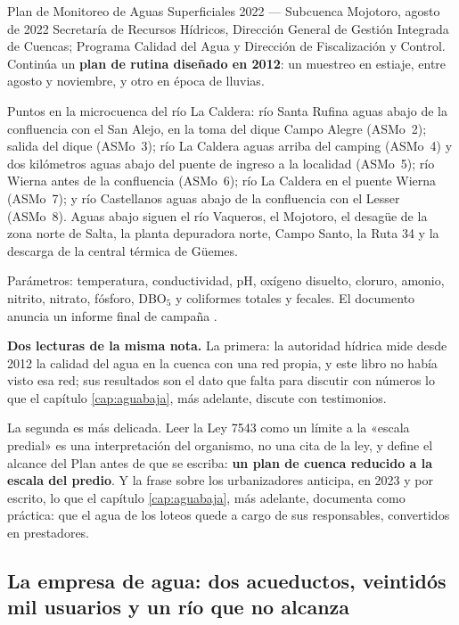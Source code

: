 \begin{ficha}{Plan de Monitoreo de Aguas Superficiales 2022 --- Subcuenca Mojotoro, agosto de 2022}
Secretaría de Recursos Hídricos, Dirección General de Gestión Integrada de Cuencas; Programa Calidad del Agua y Dirección de Fiscalización y Control. Continúa un \textbf{plan de rutina diseñado en 2012}: un muestreo en estiaje, entre agosto y noviembre, y otro en época de lluvias.

Puntos en la microcuenca del río La Caldera: río Santa Rufina aguas abajo de la confluencia con el San Alejo, en la toma del dique Campo Alegre (ASMo~2); salida del dique (ASMo~3); río La Caldera aguas arriba del camping (ASMo~4) y dos kilómetros aguas abajo del puente de ingreso a la localidad (ASMo~5); río Wierna antes de la confluencia (ASMo~6); río La Caldera en el puente Wierna (ASMo~7); y río Castellanos aguas abajo de la confluencia con el Lesser (ASMo~8). Aguas abajo siguen el río Vaqueros, el Mojotoro, el desagüe de la zona norte de Salta, la planta depuradora norte, Campo Santo, la Ruta 34 y la descarga de la central térmica de Güemes.

Parámetros: temperatura, conductividad, pH, oxígeno disuelto, cloruro, amonio, nitrito, nitrato, fósforo, DBO$_5$ y coliformes totales y fecales. El documento anuncia un informe final de campaña .
\end{ficha}

\begin{cautela}
\textbf{Dos lecturas de la misma nota.} La primera: la autoridad hídrica mide desde 2012 la calidad del agua en la cuenca con una red propia, y este libro no había visto esa red; sus resultados son el dato que falta para discutir con números lo que el capítulo \ref{cap:aguabaja}, más adelante, discute con testimonios.

La segunda es más delicada. Leer la Ley 7543 como un límite a la «escala predial» es una interpretación del organismo, no una cita de la ley, y define el alcance del Plan antes de que se escriba: \textbf{un plan de cuenca reducido a la escala del predio}. Y la frase sobre los urbanizadores anticipa, en 2023 y por escrito, lo que el capítulo \ref{cap:aguabaja}, más adelante, documenta como práctica: que el agua de los loteos quede a cargo de sus responsables, convertidos en prestadores.
\end{cautela}

\subsection*{La empresa de agua: dos acueductos, veintidós mil usuarios y un río que no alcanza}

